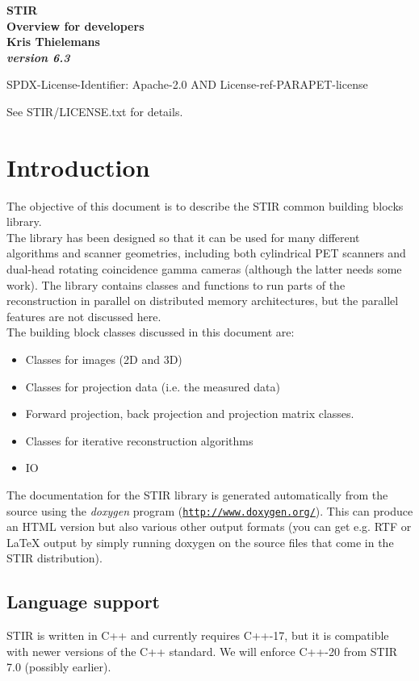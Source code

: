 \documentclass{article}
\def\R2Lurl#1#2{\mbox{\href{#1}{\tt #2}}}
\begin{document}
\begin{center}
\textbf{{\huge STIR \\
Overview for developers}}\\
\textbf{Kris Thielemans}\\
\textbf{\textit{version 6.3}}

\end{center}

SPDX-License-Identifier: Apache-2.0 AND License-ref-PARAPET-license

See STIR/LICENSE.txt for details.

\tableofcontents


\section{
Introduction}

The objective of this document is to describe the STIR common 
building blocks library.\\
The library has been designed so that it can be used for many 
different algorithms and scanner geometries, including both cylindrical 
PET scanners and dual-head rotating coincidence gamma cameras 
(although the latter needs some work). The library contains classes 
and functions to run parts of the reconstruction in parallel 
on distributed memory architectures, but the parallel features 
are not discussed here.\\
The building block classes discussed in this document are:
\begin{itemize}
\item
Classes for images (2D and 3D)
\item 
Classes for projection data (i.e. the measured data)
\item 
Forward projection, back projection and projection matrix classes.
\item 
Classes for iterative reconstruction algorithms
\item IO
\end{itemize}

The documentation
for the STIR library is generated automatically from the source 
using the \textit{doxygen} program (\R2Lurl{http://www.doxygen.org/ }{http://www.doxygen.org/}). 
This can produce an HTML version but also various other output 
formats (you can get e.g. RTF or LaTeX output by simply running 
doxygen on the source files that come in the STIR distribution). 

\subsection{Language support}
STIR is written in C++ and currently requires C++-17, but it is compatible with newer versions of the C++ standard.
We will enforce C++-20 from STIR 7.0 (possibly earlier).
\end{document}
